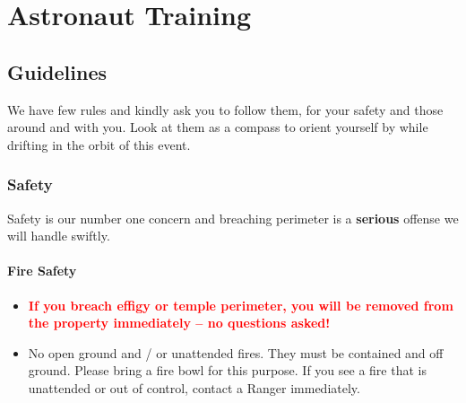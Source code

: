%
%

\chapter{Astronaut Training}

\section*{Guidelines}
We have few rules and kindly ask you to follow them, for your safety and those around and with you.  Look at them as a compass to orient yourself by while drifting in the orbit of this event. 

\subsection*{Safety}
Safety is our number one concern and breaching perimeter is a \textbf{serious} offense we will handle swiftly. 

\subsubsection*{Fire Safety}
\begin{itemize}[noitemsep]
\item \textbf{\textcolor{red}{If you breach effigy or temple perimeter, you will be removed from the property immediately -- no questions asked!}} 
\item No open ground and / or unattended fires. They must be contained and off ground. Please bring a fire bowl for this purpose. If you see a fire that is unattended or out of control, contact a Ranger immediately.
\end{itemize}

